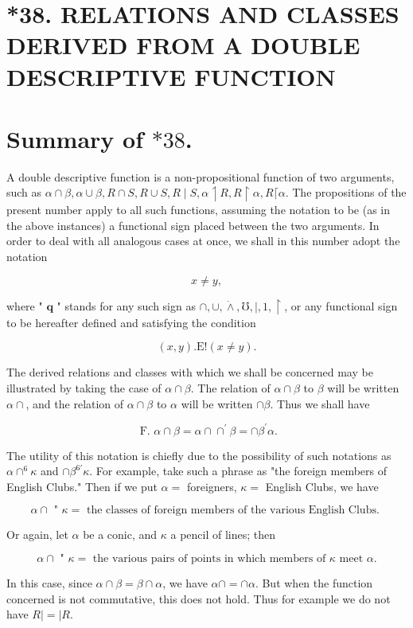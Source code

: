 \documentclass[10pt]{article}
\begin{document}
\section*{*38. RELATIONS AND CLASSES DERIVED FROM A DOUBLE DESCRIPTIVE FUNCTION}
\section*{Summary of $* 38$.}
A double descriptive function is a non-propositional function of two arguments, such as $\alpha \cap \beta, \alpha \cup \beta, R \cap S, R \cup S, R \mid S, \alpha \upharpoonleft R, R \upharpoonright \alpha, R\lceil\alpha$. The propositions of the present number apply to all such functions, assuming the notation to be (as in the above instances) a functional sign placed between the two arguments. In order to deal with all analogous cases at once, we shall in this number adopt the notation

$$
x \neq y,
$$

where " $\boldsymbol{q}$ " stands for any such sign as $\cap, \cup, \dot{\wedge}, \mho, \mid, 1, \upharpoonright$, or any functional sign to be hereafter defined and satisfying the condition

$$
(x, y) . \mathrm{E}!(x \neq y) .
$$

The derived relations and classes with which we shall be concerned may be illustrated by taking the case of $\alpha \cap \beta$. The relation of $\alpha \cap \beta$ to $\beta$ will be written $\alpha \cap$, and the relation of $\alpha \cap \beta$ to $\alpha$ will be written $\cap \beta$. Thus we shall have

$$
\text { F. } \alpha \cap \beta=\alpha \cap \cap^{\prime} \beta=\cap \beta^{\prime} \alpha .
$$

The utility of this notation is chiefly due to the possibility of such notations as $\alpha \cap^{6} \kappa$ and $\cap \beta^{6 \prime} \kappa$. For example, take such a phrase as "the foreign members of English Clubs." Then if we put $\alpha=$ foreigners, $\kappa=$ English Clubs, we have

$$
\alpha \cap \text { " } \kappa=\text { the classes of foreign members of the various English Clubs. }
$$

Or again, let $\alpha$ be a conic, and $\kappa$ a pencil of lines; then

$$
\alpha \cap \text { " } \kappa=\text { the various pairs of points in which members of } \kappa \text { meet } \alpha .
$$

In this case, since $\alpha \cap \beta=\beta \cap \alpha$, we have $\alpha \cap=\cap \alpha$. But when the function concerned is not commutative, this does not hold. Thus for example we do not have $R|=| R$.
\end{document}
